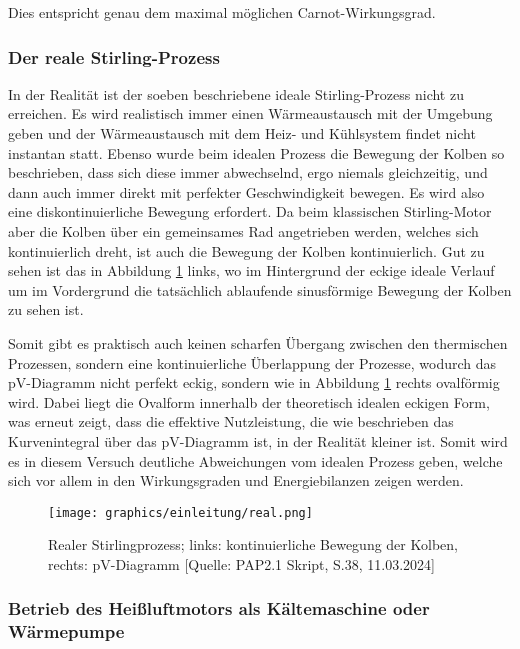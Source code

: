 \documentclass{article}
\begin{document}
Dies entspricht genau dem maximal möglichen Carnot-Wirkungsgrad. 

\subsubsection{Der reale Stirling-Prozess}

In der Realität ist der soeben beschriebene ideale Stirling-Prozess nicht zu erreichen. Es wird realistisch immer einen Wärmeaustausch mit der Umgebung geben und der Wärmeaustausch mit dem Heiz- und Kühlsystem findet nicht instantan statt. Ebenso wurde beim idealen Prozess die Bewegung der Kolben so beschrieben, dass sich diese immer abwechselnd, ergo niemals gleichzeitig, und dann auch immer direkt mit perfekter Geschwindigkeit bewegen. Es wird also eine diskontinuierliche Bewegung erfordert. Da beim klassischen Stirling-Motor aber die Kolben über ein gemeinsames Rad angetrieben werden, welches sich kontinuierlich dreht, ist auch die Bewegung der Kolben kontinuierlich. Gut zu sehen ist das in Abbildung \ref{fig:realStirling} links, wo im Hintergrund der eckige ideale Verlauf um im Vordergrund die tatsächlich ablaufende sinusförmige Bewegung der Kolben zu sehen ist. 

Somit gibt es praktisch auch keinen scharfen Übergang zwischen den thermischen Prozessen, sondern eine kontinuierliche Überlappung der Prozesse, wodurch das pV-Diagramm nicht perfekt eckig, sondern wie in Abbildung \ref{fig:realStirling} rechts ovalförmig wird. Dabei liegt die Ovalform innerhalb der theoretisch idealen eckigen Form, was erneut zeigt, dass die effektive Nutzleistung, die wie beschrieben das Kurvenintegral über das pV-Diagramm ist, in der Realität kleiner ist. Somit wird es in diesem Versuch deutliche Abweichungen vom idealen Prozess geben, welche sich vor allem in den Wirkungsgraden und Energiebilanzen zeigen werden. 

\begin{figure}[!b]
    \centering
    \texttt{[image: graphics/einleitung/real.png]}
    \caption{Realer Stirlingprozess; links: kontinuierliche Bewegung der Kolben, rechts: pV-Diagramm [Quelle: PAP2.1 Skript, S.38, 11.03.2024]}
    \label{fig:realStirling}
\end{figure}

\newpage
\subsubsection{Betrieb des Heißluftmotors als Kältemaschine oder Wärmepumpe}
\end{document}
